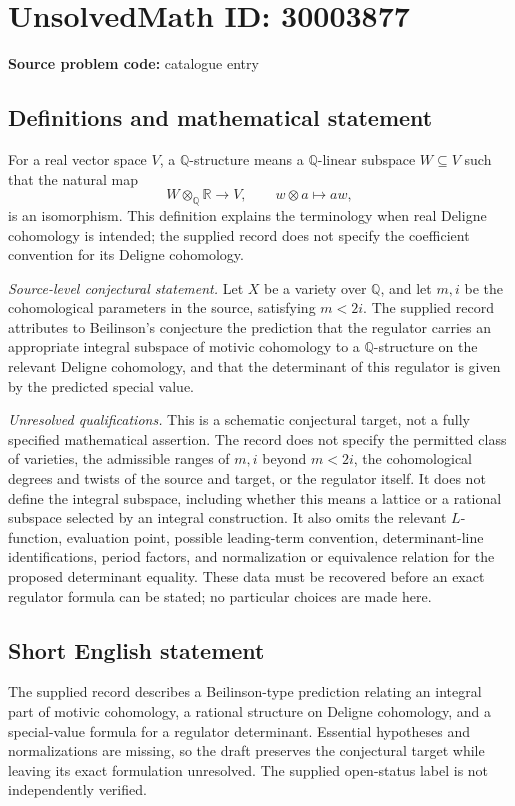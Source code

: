 \documentclass[11pt]{article}
\newcommand{\Q}{\mathbb{Q}}
\newcommand{\R}{\mathbb{R}}
\begin{document}
\section*{UnsolvedMath ID: 30003877}
\textbf{Source problem code:} catalogue entry
\subsection{Definitions and mathematical statement}
For a real vector space \(V\), a \(\Q\)-structure means a \(\Q\)-linear subspace \(W\subseteq V\) such that the natural map
\[
W\otimes_{\Q}\R\longrightarrow V,\qquad w\otimes a\longmapsto aw,
\]
is an isomorphism. This definition explains the terminology when real Deligne cohomology is intended; the supplied record does not specify the coefficient convention for its Deligne cohomology.

\emph{Source-level conjectural statement.} Let \(X\) be a variety over \(\Q\), and let \(m,i\) be the cohomological parameters in the source, satisfying \(m<2i\). The supplied record attributes to Beilinson's conjecture the prediction that the regulator carries an appropriate integral subspace of motivic cohomology to a \(\Q\)-structure on the relevant Deligne cohomology, and that the determinant of this regulator is given by the predicted special value.

\emph{Unresolved qualifications.} This is a schematic conjectural target, not a fully specified mathematical assertion. The record does not specify the permitted class of varieties, the admissible ranges of \(m,i\) beyond \(m<2i\), the cohomological degrees and twists of the source and target, or the regulator itself. It does not define the integral subspace, including whether this means a lattice or a rational subspace selected by an integral construction. It also omits the relevant \(L\)-function, evaluation point, possible leading-term convention, determinant-line identifications, period factors, and normalization or equivalence relation for the proposed determinant equality. These data must be recovered before an exact regulator formula can be stated; no particular choices are made here.
\subsection{Short English statement}
The supplied record describes a Beilinson-type prediction relating an integral part of motivic cohomology, a rational structure on Deligne cohomology, and a special-value formula for a regulator determinant. Essential hypotheses and normalizations are missing, so the draft preserves the conjectural target while leaving its exact formulation unresolved. The supplied open-status label is not independently verified.
\end{document}
